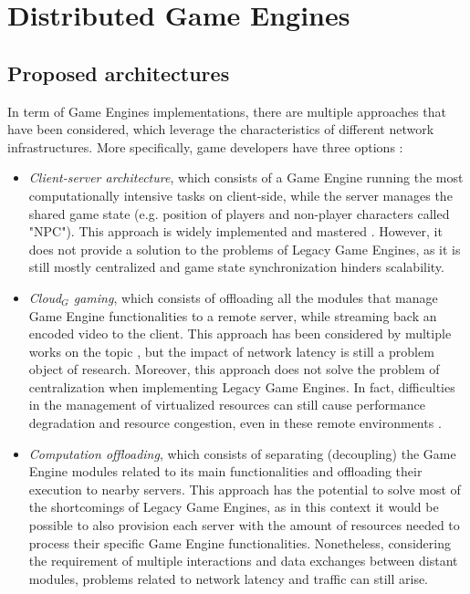 \section{Distributed Game Engines}

\subsection{Proposed architectures}
In term of Game Engines implementations, there are multiple approaches that have been considered, which leverage the characteristics of different network infrastructures. More specifically, game developers have three options \cite{womak:performance-analysis-game-engine}:
\begin{itemize}
	\item \textit{Client-server architecture}, which consists of a Game Engine running the most computationally intensive tasks on client-side, while the server manages the shared game state (e.g. position of players and non-player characters called "NPC"). This approach is widely implemented and mastered \cite{womak:performance-analysis-game-engine}. However, it does not provide a solution to the problems of Legacy Game Engines, as it is still mostly centralized and game state synchronization hinders scalability.
	\item \textit{Cloud$_G$ gaming}, which consists of offloading all the modules that manage Game Engine functionalities to a remote server, while streaming back an encoded video to the client. This approach has been considered by multiple works on the topic \cite{womak:revamping-cloud-games, womak:distributed-cloud-gaming-pipeline}, but the impact of network latency is still a problem object of research. Moreover, this approach does not solve the problem of centralization when implementing Legacy Game Engines. In fact, difficulties in the management of virtualized resources  can still cause performance degradation and resource congestion, even in these remote environments \cite{womak:performance-analysis-game-engine}.
	\item \textit{Computation offloading}, which consists of separating (decoupling) the Game Engine modules related to its main functionalities and offloading their execution to nearby servers. This approach has the potential to solve most of the shortcomings of Legacy Game Engines, as in this context it would be possible to also provision each server with the amount of resources needed to process their specific Game Engine functionalities. Nonetheless, considering the requirement of multiple interactions and data exchanges between distant modules, problems related to network latency and traffic can still arise.
\end{itemize}

